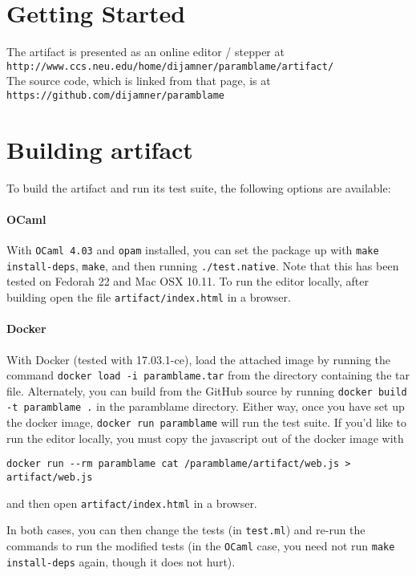 \documentclass[11pt,numbers,nocopyrightspace,acmlarge,anonymous]{acmart}
\begin{document}
\section{Getting Started}

The artifact is presented as an online editor / stepper at\\

\verb|http://www.ccs.neu.edu/home/dijamner/paramblame/artifact/| \\

\noindent The source code, which is linked from that page, is at\\

\verb|https://github.com/dijamner/paramblame| 

\section{Building artifact}

To build the artifact and run its test suite, the following options
are available:

\paragraph{OCaml} With \verb|OCaml 4.03| and \verb|opam| installed,
you can set the package up with \verb|make install-deps|, \verb|make|,
and then running \verb|./test.native|. Note that this has been tested
on Fedorah 22 and Mac OSX 10.11. To run the editor locally,
after building open the file \verb|artifact/index.html| in a browser.

\paragraph{Docker} With Docker (tested with 17.03.1-ce), 
load the attached image by running the command
\verb|docker load -i paramblame.tar| from the directory containing the tar file. Alternately,
you can build from the GitHub source by running 
\verb|docker build -t paramblame .| in the paramblame directory.
Either way, once you have set up the docker image,
 \verb|docker run paramblame| will run the test
suite. If you'd like to run the editor locally, you must copy the
javascript out of the docker image with

\verb|docker run --rm paramblame cat /paramblame/artifact/web.js > artifact/web.js| 

\noindent and then open \verb|artifact/index.html| in a browser.

In both cases, you can then change the tests (in \verb|test.ml|) and
re-run the commands to run the modified tests (in the \verb|OCaml|
case, you need not run \verb|make install-deps| again, though it does
not hurt).
\end{document}
